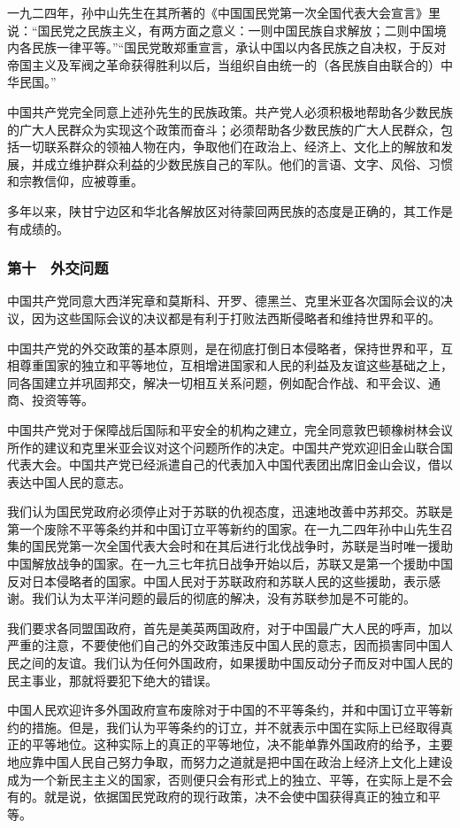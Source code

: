一九二四年，孙中山先生在其所著的《中国国民党第一次全国代表大会宣言》里说：“国民党之民族主义，有两方面之意义：一则中国民族自求解放；二则中国境内各民族一律平等。”“国民党敢郑重宣言，承认中国以内各民族之自决权，于反对帝国主义及军阀之革命获得胜利以后，当组织自由统一的（各民族自由联合的）中华民国。”

中国共产党完全同意上述孙先生的民族政策。共产党人必须积极地帮助各少数民族的广大人民群众为实现这个政策而奋斗；必须帮助各少数民族的广大人民群众，包括一切联系群众的领袖人物在内，争取他们在政治上、经济上、文化上的解放和发展，并成立维护群众利益的少数民族自己的军队。他们的言语、文字、风俗、习惯和宗教信仰，应被尊重。

多年以来，陕甘宁边区和华北各解放区对待蒙回两民族的态度是正确的，其工作是有成绩的。

\subsubsection{第十　外交问题}

中国共产党同意大西洋宪章和莫斯科、开罗、德黑兰、克里米亚各次国际会议的决议，因为这些国际会议的决议都是有利于打败法西斯侵略者和维持世界和平的。

中国共产党的外交政策的基本原则，是在彻底打倒日本侵略者，保持世界和平，互相尊重国家的独立和平等地位，互相增进国家和人民的利益及友谊这些基础之上，同各国建立并巩固邦交，解决一切相互关系问题，例如配合作战、和平会议、通商、投资等等。

中国共产党对于保障战后国际和平安全的机构之建立，完全同意敦巴顿橡树林会议所作的建议和克里米亚会议对这个问题所作的决定。中国共产党欢迎旧金山联合国代表大会。中国共产党已经派遣自己的代表加入中国代表团出席旧金山会议，借以表达中国人民的意志。

我们认为国民党政府必须停止对于苏联的仇视态度，迅速地改善中苏邦交。苏联是第一个废除不平等条约并和中国订立平等新约的国家。在一九二四年孙中山先生召集的国民党第一次全国代表大会时和在其后进行北伐战争时，苏联是当时唯一援助中国解放战争的国家。在一九三七年抗日战争开始以后，苏联又是第一个援助中国反对日本侵略者的国家。中国人民对于苏联政府和苏联人民的这些援助，表示感谢。我们认为太平洋问题的最后的彻底的解决，没有苏联参加是不可能的。

我们要求各同盟国政府，首先是美英两国政府，对于中国最广大人民的呼声，加以严重的注意，不要使他们自己的外交政策违反中国人民的意志，因而损害同中国人民之间的友谊。我们认为任何外国政府，如果援助中国反动分子而反对中国人民的民主事业，那就将要犯下绝大的错误。

中国人民欢迎许多外国政府宣布废除对于中国的不平等条约，并和中国订立平等新约的措施。但是，我们认为平等条约的订立，并不就表示中国在实际上已经取得真正的平等地位。这种实际上的真正的平等地位，决不能单靠外国政府的给予，主要地应靠中国人民自己努力争取，而努力之道就是把中国在政治上经济上文化上建设成为一个新民主主义的国家，否则便只会有形式上的独立、平等，在实际上是不会有的。就是说，依据国民党政府的现行政策，决不会使中国获得真正的独立和平等。

